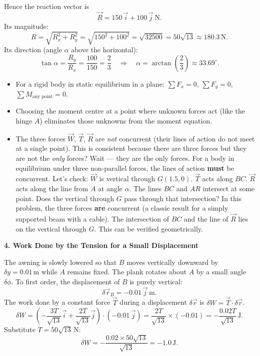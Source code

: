 \documentclass[11pt]{article}
\begin{document}
Hence the reaction vector is
\[
\vec{R} = 150\,\vec{i} + 100\,\vec{j}\ \mathrm{N}.
\]
Its magnitude:
\[
R = \sqrt{R_x^2 + R_y^2} = \sqrt{150^2 + 100^2} = \sqrt{32500} = 50\sqrt{13} \approx 180.3\,\mathrm{N}.
\]
Its direction (angle $\alpha$ above the horizontal):
\[
\tan\alpha = \frac{R_y}{R_x} = \frac{100}{150} = \frac{2}{3} \quad\Rightarrow\quad \alpha = \arctan\left(\frac{2}{3}\right) \approx 33.69^\circ.
\]

\begin{aretenir}
\begin{itemize}
\item For a rigid body in static equilibrium in a plane:
      $\sum F_x = 0$, $\sum F_y = 0$, $\sum M_{\text{any point}} = 0$.
\item Choosing the moment centre at a point where unknown forces act (like the hinge $A$) eliminates those unknowns from the moment equation.
\item The three forces $\vec{W}$, $\vec{T}$, $\vec{R}$ are \emph{not} concurrent (their lines of action do not meet at a single point). This is consistent because there are three forces but they are not the \emph{only} forces? Wait — they are the only forces. For a body in equilibrium under three non-parallel forces, the lines of action \textbf{must} be concurrent. Let's check: $\vec{W}$ is vertical through $G(1.5,0)$. $\vec{T}$ acts along $BC$. $\vec{R}$ acts along the line from $A$ at angle $\alpha$. The lines $BC$ and $AR$ intersect at some point. Does the vertical through $G$ pass through that intersection? In this problem, the three forces \textbf{are} concurrent (a classic result for a simply supported beam with a cable). The intersection of $BC$ and the line of $\vec{R}$ lies on the vertical through $G$. This can be verified geometrically.
\end{itemize}
\end{aretenir}

\textbf{4. Work Done by the Tension for a Small Displacement}\par
The awning is slowly lowered so that $B$ moves vertically downward by $\delta y = 0.01\,\mathrm{m}$ while $A$ remains fixed. The plank rotates about $A$ by a small angle $\delta\phi$. To first order, the displacement of $B$ is purely vertical:
\[
\delta \vec{r}_B = -0.01\,\vec{j}\ \mathrm{m}.
\]
The work done by a constant force $\vec{T}$ during a displacement $\delta \vec{r}$ is $\delta W = \vec{T} \cdot \delta \vec{r}$.
\[
\delta W = \left(-\frac{3T}{\sqrt{13}}\vec{i} + \frac{2T}{\sqrt{13}}\vec{j}\right) \cdot \left(-0.01\,\vec{j}\right)
= \frac{2T}{\sqrt{13}} \times (-0.01) = -\frac{0.02T}{\sqrt{13}}\,\mathrm{J}.
\]
Substitute $T = 50\sqrt{13}\,\mathrm{N}$:
\[
\delta W = -\frac{0.02 \times 50\sqrt{13}}{\sqrt{13}} = -1.0\,\mathrm{J}.
\]
\end{document}
